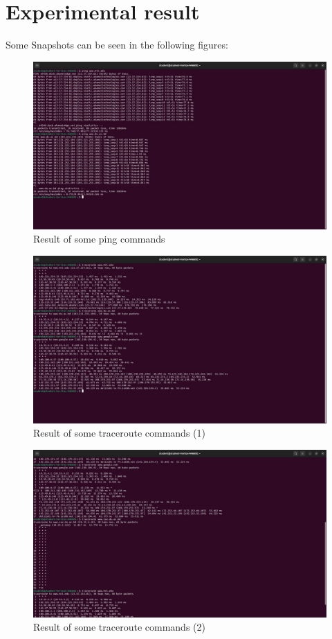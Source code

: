 \documentclass[11pt]{article}
\begin{document}
\section{Experimental result}

Some Snapshots can be seen in the following figures: 
\begin{figure}
\centering
\includegraphics[width=\textwidth]{ping 1.jpg}
\caption{Result of some ping commands}
\end{figure}

\begin{figure}
\centering
\includegraphics[width=\textwidth]{traceroute 2.jpg}
\caption{Result of some traceroute commands (1)}
\end{figure}

\begin{figure}
    \centering
    \includegraphics[width=\textwidth]{traceroute 3.jpg}
    \caption{Result of some traceroute commands (2)}
\end{figure}
\end{document}

